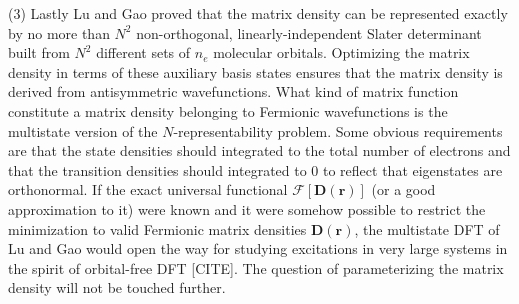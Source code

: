 \documentclass[journal=jacsat,manuscript=article]{achemso}
\newcommand\m[1]{\mathbf{#1}}
\renewcommand\vec[1]{\mathbf{#1}}
\begin{document}
(3) Lastly Lu and Gao proved that the matrix density can be represented exactly by no more than $N^2$ non-orthogonal, linearly-independent
Slater determinant built from $N^2$ different sets of $n_e$ molecular orbitals. \cite{Lu2022JPCL}
Optimizing the matrix density in terms of these auxiliary basis states ensures
that the matrix density is derived from antisymmetric wavefunctions. 
What kind of matrix function constitute a matrix density belonging to Fermionic wavefunctions is the
multistate version of the $N$-representability problem. Some obvious requirements are that the state densities should
integrated to the total number of electrons and that the transition densities should integrated to 0 to reflect that
eigenstates are orthonormal. If the exact universal functional $\m{\mathcal{F}}[\m{D}(\vec{r})]$ (or a good approximation to it)
were known and it were somehow possible to restrict the minimization to valid Fermionic matrix densities $\m{D}(\vec{r})$,
the multistate DFT of Lu and Gao would open the way for studying excitations in very large systems in the spirit of orbital-free DFT [CITE].
The question of parameterizing the matrix density will not be touched further.

\end{document}
